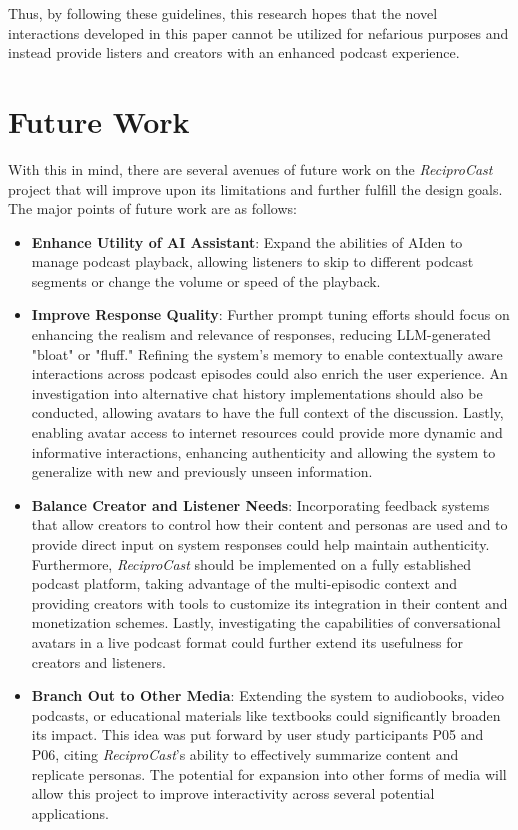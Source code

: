 \documentclass[12pt]{report}
\begin{document}
\begin{myfont}
        Thus, by following these guidelines, this research hopes that the novel interactions developed in this paper cannot be utilized for nefarious purposes and instead provide listers and creators with an enhanced podcast experience.

        \section{Future Work}
        With this in mind, there are several avenues of future work on the \textit{ReciproCast} project that will improve upon its limitations and further fulfill the design goals. The major points of future work are as follows:
        
        \begin{itemize}
            \item \textbf{Enhance Utility of AI Assistant}: Expand the abilities of AIden to manage podcast playback, allowing listeners to skip to different podcast segments or change the volume or speed of the playback.
            \item \textbf{Improve Response Quality}: Further prompt tuning efforts should focus on enhancing the realism and relevance of responses, reducing LLM-generated "bloat" or "fluff." Refining the system's memory to enable contextually aware interactions across podcast episodes could also enrich the user experience. An investigation into alternative chat history implementations should also be conducted, allowing avatars to have the full context of the discussion. Lastly, enabling avatar access to internet resources could provide more dynamic and informative interactions, enhancing authenticity and allowing the system to generalize with new and previously unseen information.
            \item \textbf{Balance Creator and Listener Needs}: Incorporating feedback systems that allow creators to control how their content and personas are used and to provide direct input on system responses could help maintain authenticity. Furthermore, 
            \textit{ReciproCast} should be implemented on a fully established podcast platform, taking advantage of the multi-episodic context and providing creators with tools to customize its integration in their content and monetization schemes. Lastly, investigating the capabilities of conversational avatars in a live podcast format could further extend its usefulness for creators and listeners.
            \item \textbf{Branch Out to Other Media}: Extending the system to audiobooks, video podcasts, or educational materials like textbooks could significantly broaden its impact. This idea was put forward by user study participants P05 and P06, citing \textit{ReciproCast}'s ability to effectively summarize content and replicate personas. The potential for expansion into other forms of media will allow this project to improve interactivity across several potential applications.

\end{itemize}
\end{myfont}
\end{document}
